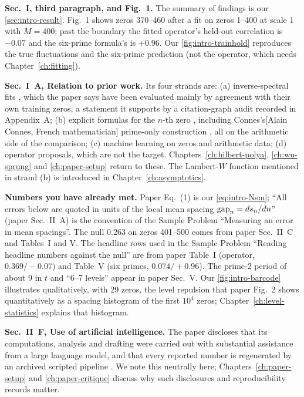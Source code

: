 \textbf{Sec.~I, third paragraph, and Fig.~1.} The summary of findings is our \cref{sec:intro-result}. Fig.~1 shows zeros 370--460 after a fit on zeros 1--400 at scale 1 with $M=400$; past the boundary the fitted operator's held-out correlation is $-0.07$ and the six-prime formula's is $+0.96$. Our \cref{fig:intro-trainhold} reproduces the true fluctuations and the six-prime prediction (not the operator, which needs Chapter~\ref{ch:fitting}).

\textbf{Sec.~I~A, Relation to prior work.} Its four strands are: (a) inverse-spectral fits \cite{wusprung,vanzyl,slater,jaksch}, which the paper says have been evaluated mainly by agreement with their own training zeros, a statement it supports by a citation-graph audit recorded in Appendix~A; (b) explicit formulas for the $n$-th zero \cite{francaleclair,leclair}, including Connes's[Alain Connes, French mathematician] prime-only construction \cite{connes26}, all on the arithmetic side of the comparison; (c) machine learning on zeros and arithmetic data; (d) operator proposals, which are not the target. Chapters~\ref{ch:hilbert-polya}, \ref{ch:wu-sprung} and \ref{ch:paper-setup} return to these. The Lambert-$W$ function mentioned in strand (b) is introduced in Chapter~\ref{ch:asymptotics}.

\textbf{Numbers you have already met.} Paper Eq.~(1) is our \cref{eq:intro-Nsm}; ``All errors below are quoted in units of the local mean spacing $\mathrm{gap}_n = ds_n/dn$'' (paper Sec.~II~A) is the convention of the Sample Problem ``Measuring an error in mean spacings''. The null $0.263$ on zeros 401--500 comes from paper Sec.~II~C and Tables~I and V. The headline rows used in the Sample Problem ``Reading headline numbers against the null'' are from paper Table~I (operator, $0.369/-0.07$) and Table~V (six primes, $0.074/+0.96$). The prime-2 period of about 9 in $t$ and ``6--7 levels'' appear in paper Sec.~V. Our \cref{fig:intro-barcode} illustrates qualitatively, with 29 zeros, the level repulsion that paper Fig.~2 shows quantitatively as a spacing histogram of the first $10^4$ zeros; Chapter~\ref{ch:level-statistics} explains that histogram.

\textbf{Sec.~II~F, Use of artificial intelligence.} The paper discloses that its computations, analysis and drafting were carried out with substantial assistance from a large language model, and that every reported number is regenerated by an archived scripted pipeline \cite{zenodo}. We note this neutrally here; Chapters~\ref{ch:paper-setup} and \ref{ch:paper-critique} discuss why such disclosures and reproducibility records matter.

